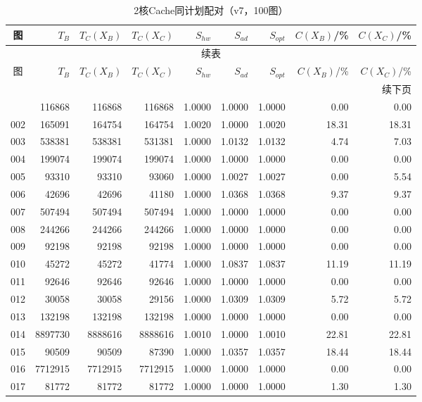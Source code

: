 \begin{longtable}{crrrrrrrr}
\caption{2核Cache同计划配对（v7，100图）}\label{tab:cache-detail-2}\\
\toprule
图 & $T_B$ & $T_C(X_B)$ & $T_C(X_C)$ & $S_{hw}$ & $S_{ad}$ & $S_{opt}$ & $C(X_B)$/\% & $C(X_C)$/\% \\
\midrule
\endfirsthead
\multicolumn{9}{c}{续表}\\
\toprule
图 & $T_B$ & $T_C(X_B)$ & $T_C(X_C)$ & $S_{hw}$ & $S_{ad}$ & $S_{opt}$ & $C(X_B)$/\% & $C(X_C)$/\% \\
\midrule
\endhead
\midrule\multicolumn{9}{r}{续下页}\\
\endfoot
\bottomrule
\endlastfoot
001 & 116868 & 116868 & 116868 & 1.0000 & 1.0000 & 1.0000 & 0.00 & 0.00 \\
002 & 165091 & 164754 & 164754 & 1.0020 & 1.0000 & 1.0020 & 18.31 & 18.31 \\
003 & 538381 & 538381 & 531381 & 1.0000 & 1.0132 & 1.0132 & 4.74 & 7.03 \\
004 & 199074 & 199074 & 199074 & 1.0000 & 1.0000 & 1.0000 & 0.00 & 0.00 \\
005 & 93310 & 93310 & 93060 & 1.0000 & 1.0027 & 1.0027 & 0.00 & 5.54 \\
006 & 42696 & 42696 & 41180 & 1.0000 & 1.0368 & 1.0368 & 9.37 & 9.37 \\
007 & 507494 & 507494 & 507494 & 1.0000 & 1.0000 & 1.0000 & 0.00 & 0.00 \\
008 & 244266 & 244266 & 244266 & 1.0000 & 1.0000 & 1.0000 & 0.00 & 0.00 \\
009 & 92198 & 92198 & 92198 & 1.0000 & 1.0000 & 1.0000 & 0.00 & 0.00 \\
010 & 45272 & 45272 & 41774 & 1.0000 & 1.0837 & 1.0837 & 11.19 & 11.19 \\
011 & 92646 & 92646 & 92646 & 1.0000 & 1.0000 & 1.0000 & 0.00 & 0.00 \\
012 & 30058 & 30058 & 29156 & 1.0000 & 1.0309 & 1.0309 & 5.72 & 5.72 \\
013 & 132198 & 132198 & 132198 & 1.0000 & 1.0000 & 1.0000 & 0.00 & 0.00 \\
014 & 8897730 & 8888616 & 8888616 & 1.0010 & 1.0000 & 1.0010 & 22.81 & 22.81 \\
015 & 90509 & 90509 & 87390 & 1.0000 & 1.0357 & 1.0357 & 18.44 & 18.44 \\
016 & 7712915 & 7712915 & 7712915 & 1.0000 & 1.0000 & 1.0000 & 0.00 & 0.00 \\
017 & 81772 & 81772 & 81772 & 1.0000 & 1.0000 & 1.0000 & 1.30 & 1.30 \\

\end{longtable}
